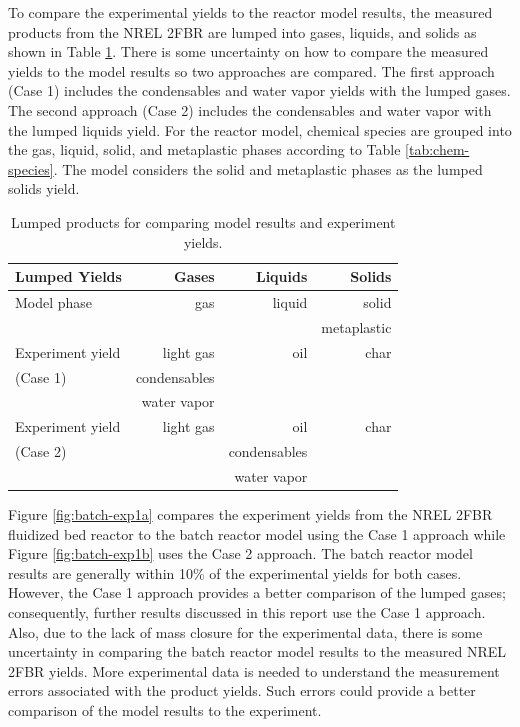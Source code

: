 To compare the experimental yields to the reactor model results, the measured products from the NREL 2FBR are lumped into gases, liquids, and solids as shown in Table \ref{tab:lumped-yields}. There is some uncertainty on how to compare the measured yields to the model results so two approaches are compared. The first approach (Case 1) includes the condensables and water vapor yields with the lumped gases. The second approach (Case 2) includes the condensables and water vapor with the lumped liquids yield. For the reactor model, chemical species are grouped into the gas, liquid, solid, and metaplastic phases according to Table \ref{tab:chem-species}. The model considers the solid and metaplastic phases as the lumped solids yield.

\begin{table}[H]
    \caption{Lumped products for comparing model results and experiment yields.}
    \label{tab:lumped-yields}
    \centering
    \begin{tabular}{lrrr}
        \toprule
        \textbf{Lumped Yields} & \textbf{Gases} & \textbf{Liquids} & \textbf{Solids} \\
        \midrule
        Model phase            & gas            & liquid           & solid \\
                               &                &                  & metaplastic \\
        \midrule
        Experiment yield       & light gas      & oil              & char \\
        (Case 1)               & condensables   &                  & \\
                               & water vapor    &                  & \\
        \midrule
        Experiment yield       & light gas      & oil              & char \\
        (Case 2)               &                & condensables     & \\
                               &                & water vapor      & \\
        \bottomrule
    \end{tabular}
\end{table}

Figure \ref{fig:batch-exp1a} compares the experiment yields from the NREL 2FBR fluidized bed reactor to the batch reactor model using the Case 1 approach while Figure \ref{fig:batch-exp1b} uses the Case 2 approach. The batch reactor model results are generally within 10\% of the experimental yields for both cases. However, the Case 1 approach provides a better comparison of the lumped gases; consequently, further results discussed in this report use the Case 1 approach. Also, due to the lack of mass closure for the experimental data, there is some uncertainty in comparing the batch reactor model results to the measured NREL 2FBR yields. More experimental data is needed to understand the measurement errors associated with the product yields. Such errors could provide a better comparison of the model results to the experiment.

